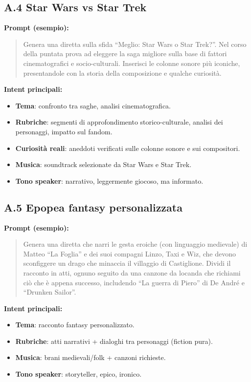 \documentclass[11pt,a4paper]{article}
\begin{document}
\subsection*{A.4 Star Wars vs Star Trek}

\textbf{Prompt (esempio):}
\begin{quote}
Genera una diretta sulla sfida ``Meglio: Star Wars o Star Trek?''. Nel corso della puntata prova ad eleggere la saga migliore sulla base di fattori cinematografici e socio-culturali. Inserisci le colonne sonore più iconiche, presentandole con la storia della composizione e qualche curiosità.
\end{quote}

\textbf{Intent principali:}
\begin{itemize}[leftmargin=*]
    \item \textbf{Tema}: confronto tra saghe, analisi cinematografica.
    \item \textbf{Rubriche}: segmenti di approfondimento storico-culturale, analisi dei personaggi, impatto sul fandom.
    \item \textbf{Curiosità reali}: aneddoti verificati sulle colonne sonore e sui compositori.
    \item \textbf{Musica}: soundtrack selezionate da Star Wars e Star Trek.
    \item \textbf{Tono speaker}: narrativo, leggermente giocoso, ma informato.
\end{itemize}

\subsection*{A.5 Epopea fantasy personalizzata}

\textbf{Prompt (esempio):}
\begin{quote}
Genera una diretta che narri le gesta eroiche (con linguaggio medievale) di Matteo ``La Foglia'' e dei suoi compagni Linzo, Taxi e Wiz, che devono sconfiggere un drago che minaccia il villaggio di Castiglione. Dividi il racconto in atti, ognuno seguito da una canzone da locanda che richiami ciò che è appena successo, includendo ``La guerra di Piero'' di De André e ``Drunken Sailor''.
\end{quote}

\textbf{Intent principali:}
\begin{itemize}[leftmargin=*]
    \item \textbf{Tema}: racconto fantasy personalizzato.
    \item \textbf{Rubriche}: atti narrativi + dialoghi tra personaggi (fiction pura).
    \item \textbf{Musica}: brani medievali/folk + canzoni richieste.
    \item \textbf{Tono speaker}: storyteller, epico, ironico.
\end{itemize}
\end{document}
